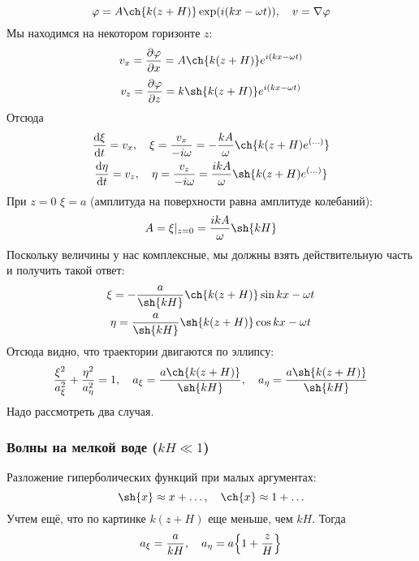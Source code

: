 \begin{equation}
    \phi = A \ch{k(z+H)}\exp(i(kx-\omega t)), \quad
    v = \nabla \phi
\end{equation}
Мы находимся на некотором горизонте $z$:
\begin{equation}
    v_x = \pdv{\phi}{x} = A\ch{k(z+H)}e^{i(kx-\omega t)}
\end{equation}
\begin{equation}
    v_z = \pdv{\phi}{z} = k\sh{k(z+H)}e^{i(kx-\omega t)} 
\end{equation}
Отсюда
\begin{gather}
    \dv{\xi}{t} = v_x, \quad \xi=\frac{v_x}{-i\omega} = -\frac{kA}{\omega}\ch{k(z+H)e^{(\ldots)}}\\
    \dv{\eta}{t} = v_z, \quad \eta=\frac{v_z}{-i\omega} = \frac{ikA}{\omega}\sh{k(z+H)e^{(\ldots)}} \\
\end{gather}
При $z = 0$ $\xi = a$ (амплитуда на поверхности равна амплитуде колебаний):
\begin{equation}
    A = \xi|_{z = 0} = \frac{ikA}{\omega}\sh{kH}
\end{equation}
Поскольку величины у нас комплексные, мы должны взять действительную часть и получить такой ответ:
\begin{gather}
    \xi = -\frac{a}{\sh{kH}}\ch{k(z+H)}\sin{kx-\omega t}\\
    \eta = \frac{a}{\sh{kH}}\sh{k(z+H)}\cos{kx-\omega t}\\
\end{gather}
Отсюда видно, что траектории двигаются по эллипсу:
\begin{equation}
    \frac{\xi^2}{a_\xi^2}+\frac{\eta^2}{a_\eta^2} = 1, 
    \quad a_\xi = \frac{a\ch{k(z+H)}}{\sh{kH}}
    , \quad a_\eta = \frac{a\sh{k(z+H)}}{\sh{kH}}
\end{equation}
Надо рассмотреть два случая.


\subsubsection{Волны на мелкой воде ($kH\ll 1$)}
Разложение гиперболических функций при малых аргументах:
\begin{equation}
    \sh{x}\approx x+\ldots, \quad \ch{x}\approx 1+\ldots
\end{equation}
Учтем ещё, что по картинке $k(z+H)$ еще меньше, чем $kH$. Тогда
\begin{equation}
    a_\xi = \frac{a}{kH}, \quad
    a_\eta = a\qty{1+\frac{z}{H}}
\end{equation}

